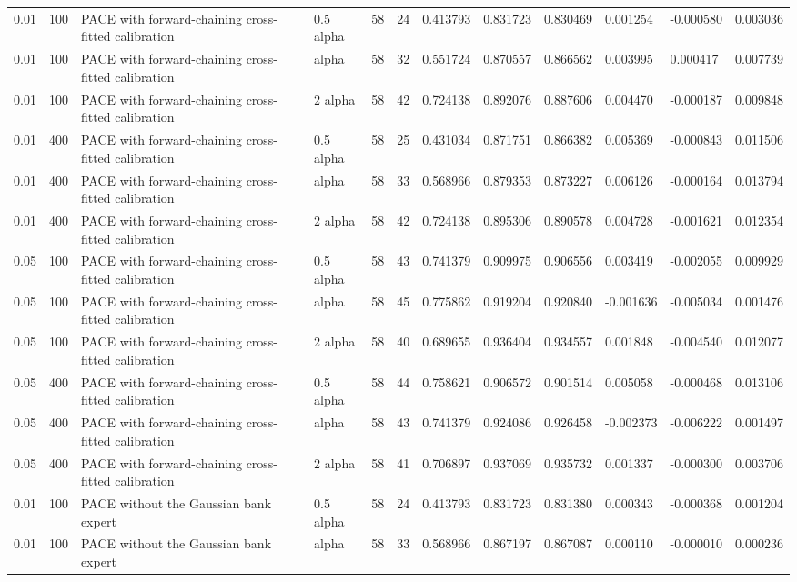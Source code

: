 \begin{tabular}{llllllllllll}
0.01 & 100 & PACE with forward-chaining cross-fitted calibration & 0.5 alpha & 58 & 24 & 0.413793 & 0.831723 & 0.830469 & 0.001254 & -0.000580 & 0.003036 \\
0.01 & 100 & PACE with forward-chaining cross-fitted calibration & alpha & 58 & 32 & 0.551724 & 0.870557 & 0.866562 & 0.003995 & 0.000417 & 0.007739 \\
0.01 & 100 & PACE with forward-chaining cross-fitted calibration & 2 alpha & 58 & 42 & 0.724138 & 0.892076 & 0.887606 & 0.004470 & -0.000187 & 0.009848 \\
0.01 & 400 & PACE with forward-chaining cross-fitted calibration & 0.5 alpha & 58 & 25 & 0.431034 & 0.871751 & 0.866382 & 0.005369 & -0.000843 & 0.011506 \\
0.01 & 400 & PACE with forward-chaining cross-fitted calibration & alpha & 58 & 33 & 0.568966 & 0.879353 & 0.873227 & 0.006126 & -0.000164 & 0.013794 \\
0.01 & 400 & PACE with forward-chaining cross-fitted calibration & 2 alpha & 58 & 42 & 0.724138 & 0.895306 & 0.890578 & 0.004728 & -0.001621 & 0.012354 \\
0.05 & 100 & PACE with forward-chaining cross-fitted calibration & 0.5 alpha & 58 & 43 & 0.741379 & 0.909975 & 0.906556 & 0.003419 & -0.002055 & 0.009929 \\
0.05 & 100 & PACE with forward-chaining cross-fitted calibration & alpha & 58 & 45 & 0.775862 & 0.919204 & 0.920840 & -0.001636 & -0.005034 & 0.001476 \\
0.05 & 100 & PACE with forward-chaining cross-fitted calibration & 2 alpha & 58 & 40 & 0.689655 & 0.936404 & 0.934557 & 0.001848 & -0.004540 & 0.012077 \\
0.05 & 400 & PACE with forward-chaining cross-fitted calibration & 0.5 alpha & 58 & 44 & 0.758621 & 0.906572 & 0.901514 & 0.005058 & -0.000468 & 0.013106 \\
0.05 & 400 & PACE with forward-chaining cross-fitted calibration & alpha & 58 & 43 & 0.741379 & 0.924086 & 0.926458 & -0.002373 & -0.006222 & 0.001497 \\
0.05 & 400 & PACE with forward-chaining cross-fitted calibration & 2 alpha & 58 & 41 & 0.706897 & 0.937069 & 0.935732 & 0.001337 & -0.000300 & 0.003706 \\
0.01 & 100 & PACE without the Gaussian bank expert & 0.5 alpha & 58 & 24 & 0.413793 & 0.831723 & 0.831380 & 0.000343 & -0.000368 & 0.001204 \\
0.01 & 100 & PACE without the Gaussian bank expert & alpha & 58 & 33 & 0.568966 & 0.867197 & 0.867087 & 0.000110 & -0.000010 & 0.000236 \\

\end{tabular}
